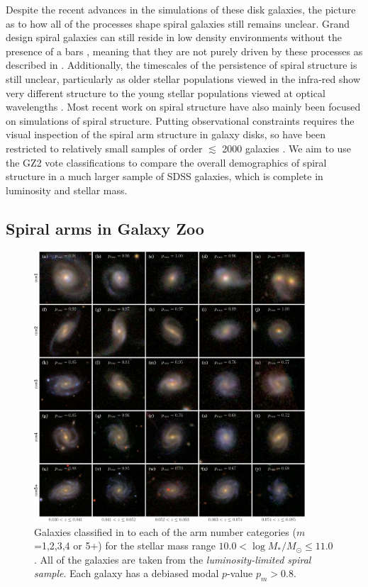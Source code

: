 \documentclass[useAMS,usenatbib]{mn2e}
\begin{document}
Despite the recent advances in the simulations of these disk galaxies, the picture as to how all of the processes shape spiral galaxies still remains unclear. Grand design spiral galaxies can still reside in low density environments without the presence of a bars  \citep{EE_82}, meaning that they are not purely driven by these processes as described in \citep{Kormendy_79}. Additionally, the timescales of the persistence of spiral structure is still unclear, particularly as older stellar populations viewed in the infra-red show very different structure to the young stellar populations viewed at optical wavelengths \citep{Block_91,Block_94,Thornley_96}. Most recent work on spiral structure have also mainly been focused on simulations of spiral structure. Putting observational constraints requires the visual inspection of the spiral arm structure in galaxy disks, so have been restricted to relatively small samples of order $\lesssim$ 2000 galaxies \citep{EE_82,EE_89,Ann_13}. We aim to use the GZ2 vote classifications to compare the overall demographics of spiral structure in a much larger sample of SDSS galaxies, which is complete in luminosity and stellar mass.
\subsection{Spiral arms in Galaxy Zoo}
\label{sec:defining_the_sample}

\begin{figure}
		\centering

        \includegraphics[width=0.9\textwidth]{Images/Results/image_page_p0810_m106110.pdf}

        \caption{Galaxies classified in to each of the arm number categories ($m$=1,2,3,4 or 5+) for the stellar mass range $10.0 < \log{M_*/M_{\odot}} \leq 11.0$. All of the galaxies are taken from the \textit{luminosity-limited spiral sample}. Each galaxy has a debiased modal $p$-value $p_m>0.8$.}

        \label{fig:image_panel_secure}

\end{figure}
\end{document}
